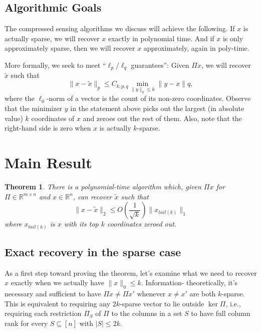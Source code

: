 \documentclass[11pt]{article}
\newcommand{\R}{\mathbb{R}}
\newtheorem{theorem}{Theorem}
\begin{document}
\subsection{Algorithmic Goals}

The compressed sensing algorithms we discuss will achieve the 
following. If $x$ is actually sparse, we will recover $x$ exactly in 
polynomial time. And if $x$ is only approximately sparse, then we 
will recover $x$ approximately, again in poly-time.

More formally, we seek to meet ``$\ell_p/\ell_q$ guarantees'': Given 
$\Pi x$, we will recover $\tilde{x}$ such that
\[\|x - \tilde{x}\|_p \le C_{k, p, q} \min_{\|y\|_0 \le k} \|y - x\|
q,\]
where the $\ell_0$-norm of a vector is the count of its non-zero 
coordinates. Observe that the minimizer $y$ in the statement above 
picks out the largest (in absolute value) $k$ coordinates of $x$ and 
zeroes out the rest of them. Also, note that the right-hand side is 
zero when $x$ is actually $k$-sparse.



\section{Main Result}

\begin{theorem}
There is a polynomial-time algorithm which, given $\Pi x$ for $\Pi \in 
\R^{m \times n}$ and $x \in \R^n$, can recover $\tilde{x}$ such that
\[\|x - \tilde{x}\|_2 \le O\left(\frac{1}{\sqrt{k}}\right) \|x_{tail(k)}\|_1\]
where $x_{tail(k)}$ is $x$ with its top $k$ coordinates zeroed out.
\end{theorem}

\subsection{Exact recovery in the sparse case}

As a first step toward proving the theorem, let's examine what we need to 
recover $x$ exactly when we actually have $\|x\|_0 \le k$. Information-
theoretically, it's necessary and sufficient to have $\Pi x \neq \Pi x'$ 
whenever $x \neq x'$ are both $k$-sparse. This is equivalent to requiring any 
$2k$-sparse vector to lie outside $\ker \Pi$, i.e., requiring each restriction 
$\Pi_S$ of $\Pi$ to the columns in a set $S$ to have full column rank for every 
$S \subseteq [n]$ with $|S| \le 2k$.
\end{document}
